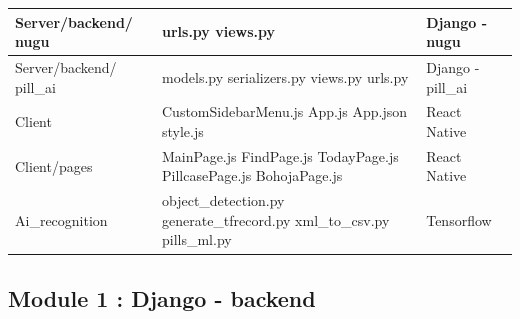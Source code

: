 \documentclass[conference]{IEEEtran}
\begin{document}
\begin{table}[h!]
\begin{tabular}{|p{}|p{}|p{}|}
\hline
Server/backend/ nugu &urls.py \newline\newline views.py&Django - nugu\\
\hline
Server/backend/ pill\_ai &models.py \newline\newline serializers.py \newline\newline views.py \newline\newline urls.py&Django - pill\_ai\\
\hline
Client &CustomSidebarMenu.js \newline\newline App.js \newline\newline App.json \newline\newline style.js &React Native \\
\hline
Client/pages &MainPage.js \newline\newline FindPage.js \newline\newline TodayPage.js \newline\newline PillcasePage.js \newline\newline BohojaPage.js &React Native \\
\hline
Ai\_recognition &  object\_detection.py \newline\newline generate\_tfrecord.py  \newline\newline xml\_to\_csv.py  \newline\newline pills\_ml.py & Tensorflow \\
\hline
\end{tabular}
\label{tab1}
\end{table}

\subsection{Module 1 : Django - backend}
\end{document}
